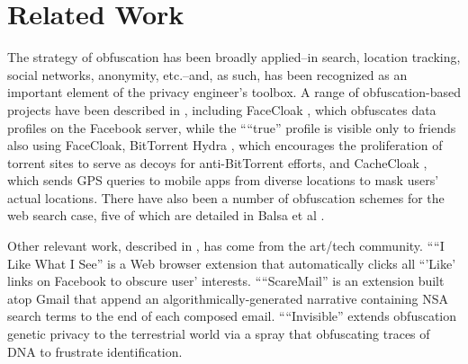 \documentclass[conference]{IEEEtran}
\begin{document}
\section{Related Work}

The strategy of obfuscation has been broadly applied--in search\cite{Howe-2}, location tracking\cite{Meyerowitz}, social networks\cite{Luo}, anonymity\cite{Chakravarty, Schulze}, etc.--and, as such, has been recognized as an important element of the privacy engineer's toolbox. A range of obfuscation-based projects have been described in \cite{Brunton}, including FaceCloak \cite{Luo}, which obfuscates data profiles on the Facebook server, while the ““true” profile is visible only to friends also using FaceCloak,  BitTorrent Hydra \cite{Schulze}, which encourages the proliferation of torrent sites to serve as decoys for anti-BitTorrent efforts, and CacheCloak \cite{Meyerowitz}, which sends GPS queries to mobile apps from diverse locations to mask users' actual locations. There have also been a number of obfuscation schemes for the web search case, five of which are detailed in Balsa et al \cite{Balsa}.

Other relevant work, described in \cite{Howe-3}, has come from the art/tech community. ““I Like What I See” is a Web browser extension that automatically clicks all “'Like' links on Facebook to obscure user' interests. ““ScareMail” \cite{Grosser} is an extension built atop Gmail that append an algorithmically-generated narrative containing NSA search terms to the end of each composed email. ““Invisible” extends obfuscation genetic privacy to the terrestrial world via a spray that obfuscating traces of DNA to frustrate identification.
\end{document}
